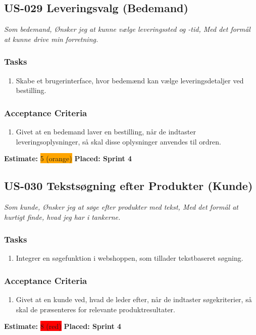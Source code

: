 \subsection{US-029 Leveringsvalg (Bedemand)}
\label{sec:US-029}
\textit{Som bedemand, Ønsker jeg at kunne vælge leveringssted og -tid, Med det formål at kunne drive min forretning.}
\subsubsection*{\textbf{Tasks}}
\begin{enumerate}
  \item Skabe et brugerinterface, hvor bedemænd kan vælge leveringsdetaljer ved bestilling.
\end{enumerate}
\subsubsection*{\textbf{Acceptance Criteria}}
\begin{enumerate}
  \item Givet at en bedemand laver en bestilling, når de indtaster leveringsoplysninger, så skal disse oplysninger anvendes til ordren.
\end{enumerate}
\textbf{Estimate:} \colorbox{orange}{5 (orange)}
\textbf{Placed: Sprint 4}
\par\noindent\dotfill

\subsection{US-030 Tekstsøgning efter Produkter (Kunde)}
\label{sec:US-030}
\textit{Som kunde, Ønsker jeg at søge efter produkter med tekst, Med det formål at hurtigt finde, hvad jeg har i tankerne.}
\subsubsection*{\textbf{Tasks}}
\begin{enumerate}
  \item Integrer en søgefunktion i webshoppen, som tillader tekstbaseret søgning.
\end{enumerate}
\subsubsection*{\textbf{Acceptance Criteria}}
\begin{enumerate}
  \item Givet at en kunde ved, hvad de leder efter, når de indtaster søgekriterier, så skal de præsenteres for relevante produktresultater.
\end{enumerate}
\textbf{Estimate:} \colorbox{red}{8 (red)}
\textbf{Placed: Sprint 4}
\par\noindent\dotfill

